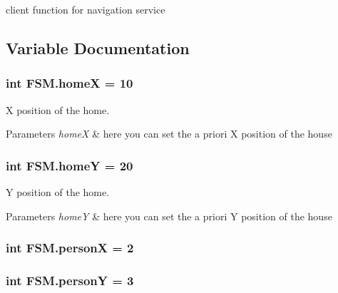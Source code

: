client function for navigation service 



\subsection{Variable Documentation}
\subsubsection[{\texorpdfstring{homeX}{homeX}}]{\setlength{\rightskip}{0pt plus 5cm}int F\+S\+M.\+homeX = 10}\hypertarget{namespaceFSM_a303869c19d8cb03e8739fc96ee328259}{}\label{namespaceFSM_a303869c19d8cb03e8739fc96ee328259}


X position of the home. 


\begin{DoxyParams}{Parameters}
{\em homeX} & here you can set the a priori X position of the house \\
\hline
\end{DoxyParams}
\subsubsection[{\texorpdfstring{homeY}{homeY}}]{\setlength{\rightskip}{0pt plus 5cm}int F\+S\+M.\+homeY = 20}\hypertarget{namespaceFSM_ae958f81bf7ca765a61e10c9bfa94ccdb}{}\label{namespaceFSM_ae958f81bf7ca765a61e10c9bfa94ccdb}


Y position of the home. 


\begin{DoxyParams}{Parameters}
{\em homeY} & here you can set the a priori Y position of the house \\
\hline
\end{DoxyParams}
\subsubsection[{\texorpdfstring{personX}{personX}}]{\setlength{\rightskip}{0pt plus 5cm}int F\+S\+M.\+personX = 2}\hypertarget{namespaceFSM_a6814b20fdc1749831628a098c34429bd}{}\label{namespaceFSM_a6814b20fdc1749831628a098c34429bd}
\subsubsection[{\texorpdfstring{personY}{personY}}]{\setlength{\rightskip}{0pt plus 5cm}int F\+S\+M.\+personY = 3}\hypertarget{namespaceFSM_a6e4bf639ff48a2a7b79bc2fdc62d3195}{}\label{namespaceFSM_a6e4bf639ff48a2a7b79bc2fdc62d3195}
